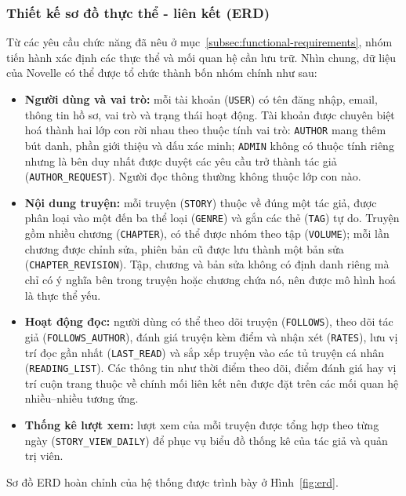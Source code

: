 \subsubsection{Thiết kế sơ đồ thực thể - liên kết (ERD)}
\label{subsubsec:erd}

Từ các yêu cầu chức năng đã nêu ở mục~\ref{subsec:functional-requirements}, nhóm tiến hành xác định các thực thể và mối quan hệ cần lưu trữ. Nhìn chung, dữ liệu của Novelle có thể được tổ chức thành bốn nhóm chính như sau:

\begin{itemize}
    \item \textbf{Người dùng và vai trò:} mỗi tài khoản (\texttt{USER}) có tên đăng nhập, email, thông tin hồ sơ, vai trò và trạng thái hoạt động. Tài khoản được chuyên biệt hoá thành hai lớp con rời nhau theo thuộc tính vai trò: \texttt{AUTHOR} mang thêm bút danh, phần giới thiệu và dấu xác minh; \texttt{ADMIN} không có thuộc tính riêng nhưng là bên duy nhất được duyệt các yêu cầu trở thành tác giả (\texttt{AUTHOR\_REQUEST}). Người đọc thông thường không thuộc lớp con nào.
    \item \textbf{Nội dung truyện:} mỗi truyện (\texttt{STORY}) thuộc về đúng một tác giả, được phân loại vào một đến ba thể loại (\texttt{GENRE}) và gắn các thẻ (\texttt{TAG}) tự do. Truyện gồm nhiều chương (\texttt{CHAPTER}), có thể được nhóm theo tập (\texttt{VOLUME}); mỗi lần chương được chỉnh sửa, phiên bản cũ được lưu thành một bản sửa (\texttt{CHAPTER\_REVISION}). Tập, chương và bản sửa không có định danh riêng mà chỉ có ý nghĩa bên trong truyện hoặc chương chứa nó, nên được mô hình hoá là thực thể yếu.
    \item \textbf{Hoạt động đọc:} người dùng có thể theo dõi truyện (\texttt{FOLLOWS}), theo dõi tác giả (\texttt{FOLLOWS\_AUTHOR}), đánh giá truyện kèm điểm và nhận xét (\texttt{RATES}), lưu vị trí đọc gần nhất (\texttt{LAST\_READ}) và sắp xếp truyện vào các tủ truyện cá nhân (\texttt{READING\_LIST}). Các thông tin như thời điểm theo dõi, điểm đánh giá hay vị trí cuộn trang thuộc về chính mối liên kết nên được đặt trên các mối quan hệ nhiều--nhiều tương ứng.
    \item \textbf{Thống kê lượt xem:} lượt xem của mỗi truyện được tổng hợp theo từng ngày (\texttt{STORY\_VIEW\_DAILY}) để phục vụ biểu đồ thống kê của tác giả và quản trị viên.
\end{itemize}

Sơ đồ ERD hoàn chỉnh của hệ thống được trình bày ở Hình~\ref{fig:erd}.

